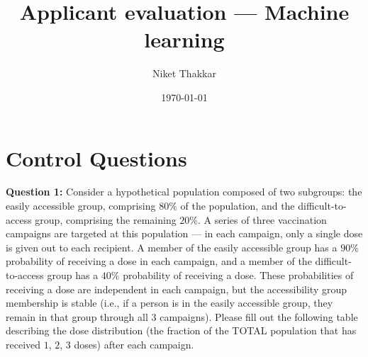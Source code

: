 \documentclass[prl,onecolumn,amsmath,amssymb,superscriptaddress,notitlepage]{revtex4-1}
\begin{document}
\title{Applicant evaluation --- Machine learning}
\date{\today}
\author{Niket Thakkar}
\maketitle

\section{Control Questions}

{\color{myred}\textbf{Question 1:} Consider a hypothetical population composed of two subgroups: the easily accessible group, comprising $80\%$ of the population, and the difficult-to-access group, comprising the remaining $20\%$.  A series of three vaccination campaigns are targeted at this population --- in each campaign, only a single dose is given out to each recipient.  A member of the easily accessible group has a $90\%$ probability of receiving a dose in each campaign, and a member of the difficult-to-access group has a $40\%$ probability of receiving a dose. These probabilities of receiving a dose are independent in each campaign, but the accessibility group membership is stable (i.e., if a person is in the easily accessible group, they remain in that group through all $3$ campaigns). Please fill out the following table describing the dose distribution (the fraction of the TOTAL population that has received $1$, $2$, $3$ doses) after each campaign.}
\\
\end{document}
